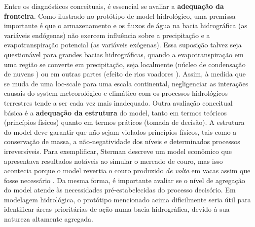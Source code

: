 \documentclass[./main.tex]{subfiles}
\begin{document}
\par Entre os diagnósticos conceituais, é essencial se avaliar a \textbf{adequação da fronteira}. Como ilustrado no protótipo de \gls{model} hidrológico, uma premissa importante é que o armazenamento e os fluxos de água na bacia hidrográfica (as variáveis endógenas) não exercem influência sobre a precipitação e a evapotranspiração potencial (as variáveis exógenas). Essa suposição talvez seja questionável para grandes bacias hidrográficas, quando a evapotranspiração em uma região se converte em precipitação, seja localmente (núcleo de condensação de nuvens \cite{Poschl2010, Kerminen2012}) ou em outras partes (efeito de rios voadores \cite{Arraut2012, Pearce2019}). Assim, à medida que se muda de uma \gls{loc-scale} para uma escala continental, negligenciar as interações causais do \gls{system} meteorológico e climático com os processos hidrológicos terrestres tende a ser cada vez mais inadequado. Outra avaliação conceitual básica é a \textbf{adequação da estrutura} do \gls{model}, tanto em termos teóricos (princípios físicos) quanto em termos práticos (tomada de decisão). A estrutura do \gls{model} deve garantir que não sejam violados princípios físicos, tais como a conservação de massa, a não-negatividade dos níveis e determinados processos irreversíveis. Para exemplificar, Sterman descreve um \gls{model} econômico que apresentava resultados notáveis ao simular o mercado de couro, mas isso acontecia porque o \gls{model} revertia o couro produzido \textit{de volta} em vacas assim que fosse necessário \cite{sterman2000}. Da mesma forma, é importante avaliar se o nível de agregação do \gls{model} atende às necessidades pré-estabelecidas do processo decisório. Em modelagem hidrológica, o protótipo mencionado acima dificilmente seria útil para identificar áreas prioritárias de ação numa bacia hidrográfica, devido à sua natureza altamente agregada. 
\end{document}
